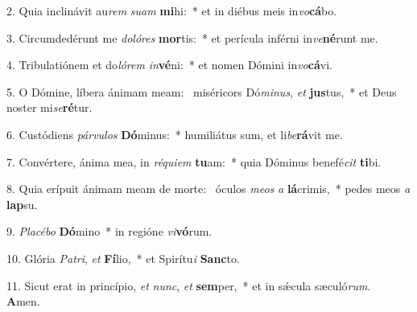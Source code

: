 2. Quia inclinávit au\textit{rem} \textit{su}\textit{am} \textbf{mi}hi:~*  et in diébus meis in\textit{vo}\textbf{cá}bo.\

3. Circumdedérunt me \textit{do}\textit{ló}\textit{res} \textbf{mor}tis:~*  et perícula inférni in\textit{ve}\textbf{né}runt me.\

4. Tribulatiónem et do\textit{ló}\textit{rem} \textit{in}\textbf{vé}ni:~*  et nomen Dómini in\textit{vo}\textbf{cá}vi.\

5. O Dómine, líbera ánimam meam: \dag\  miséricors Dó\textit{mi}\textit{nus}, \textit{et} \textbf{jus}tus,~*  et Deus noster mi\textit{se}\textbf{ré}tur.\

6. Custódiens \textit{pár}\textit{vu}\textit{los} \textbf{Dó}minus:~*  humiliátus sum, et li\textit{be}\textbf{rá}vit me.\

7. Convértere, ánima mea, in \textit{ré}\textit{qui}\textit{em} \textbf{tu}am:~*  quia Dóminus benefé\textit{cit} \textbf{ti}bi.\

8. Quia erípuit ánimam meam de morte: \dag\  óculos \textit{me}\textit{os} \textit{a} \textbf{lá}crimis,~*  pedes meos \textit{a} \textbf{lap}su.\

9. \textit{Pla}\textit{cé}\textit{bo} \textbf{Dó}mino~*  in regióne \textit{vi}\textbf{vó}rum.\

10. Glória \textit{Pa}\textit{tri}, \textit{et} \textbf{Fí}lio,~*  et Spirítu\textit{i} \textbf{Sanc}to.\

11. Sicut erat in princípio, \textit{et} \textit{nunc}, \textit{et} \textbf{sem}per,~*  et in sǽcula sæculó\textit{rum}. \textbf{A}men.\

